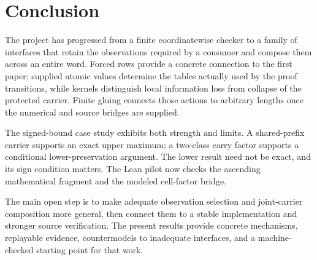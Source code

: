 \section{Conclusion}

The project has progressed from a finite coordinatewise checker to a family of interfaces that retain the observations required by a consumer and compose them across an entire word. Forced rows provide a concrete connection to the first paper: supplied atomic values determine the tables actually used by the proof transitions, while kernels distinguish local information loss from collapse of the protected carrier. Finite gluing connects those actions to arbitrary lengths once the numerical and source bridges are supplied.

The signed-bound case study exhibits both strength and limits. A shared-prefix carrier supports an exact upper maximum; a two-class carry factor supports a conditional lower-preservation argument. The lower result need not be exact, and its sign condition matters. The Lean pilot now checks the ascending mathematical fragment and the modeled cell-factor bridge.

The main open step is to make adequate observation selection and joint-carrier composition more general, then connect them to a stable implementation and stronger source verification. The present results provide concrete mechanisms, replayable evidence, countermodels to inadequate interfaces, and a machine-checked starting point for that work.
